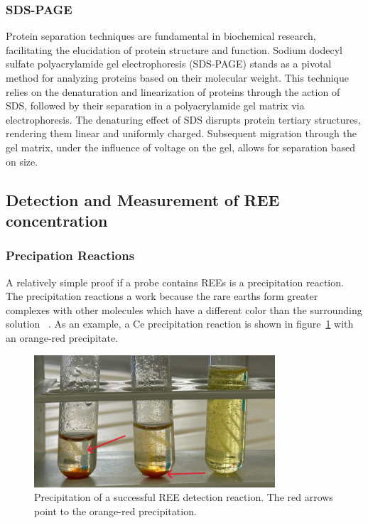 \subsubsection{SDS-PAGE\authorB{}}
Protein separation techniques are fundamental in biochemical research, facilitating the
elucidation of protein structure and function.
Sodium dodecyl sulfate polyacrylamide gel electrophoresis (SDS-PAGE) stands as a pivotal method for analyzing proteins based on their molecular weight.
This technique relies on the denaturation and linearization of proteins through the action of SDS, followed by their separation in a polyacrylamide gel matrix via electrophoresis.
The denaturing effect of SDS disrupts protein tertiary structures, rendering them linear and uniformly charged.
Subsequent migration through the gel matrix, under the influence of voltage on the gel, allows for separation based on size.

\newpage

\subsection{Detection and Measurement of REE concentration\authorA}

\subsubsection{Precipation Reactions}
A relatively simple proof if a probe contains REEs is a precipitation reaction.
The precipitation reactions a work because the rare earths form greater complexes with other molecules which have a different color than the surrounding solution ~\cite{janderblasius}.
As an example, a Ce precipitation reaction is shown in figure~\ref{fig:cer_precipitation_cropped} with an orange-red precipitate.

\begin{figure}[H]
    \centering
    \includegraphics[width=0.8\textwidth]{./media/images/ree_precipitation_reaction_cropped}
    \caption{Precipitation of a successful REE detection reaction. The red arrows point to the orange-red precipitation.}
    \label{fig:cer_precipitation_cropped}
\end{figure}

